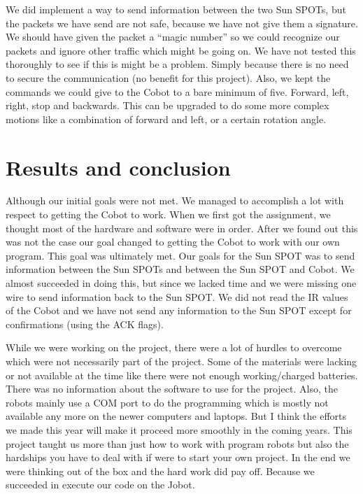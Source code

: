 \documentclass[a4paper,10pt]{article} %
\begin{document}
We did implement a way to send information between the two Sun SPOTs, but the
packets we have send are not safe, because we have not give them a signature.
We should have given the packet a ``magic number'' so we could recognize our
packets and ignore other traffic which might be going on. We have not tested
this thoroughly to see if this is might be a problem. Simply because there is no
need to secure the communication (no benefit for this project). Also, we kept
the commands we could give to the Cobot to a bare minimum of five. Forward,
left, right, stop and backwards. This can be upgraded to do some more complex
motions like a combination of forward and left, or a certain rotation angle.


\section{Results and conclusion} %



Although our initial goals were not met. We managed to accomplish a lot with
respect to getting the Cobot to work. When we first got the assignment, we
thought most of the hardware and software were in order. After we found out this
was not the case our goal changed to getting the Cobot to work with our own
program. This goal was ultimately met. Our goals for the Sun SPOT was to send
information between the Sun SPOTs and between the Sun SPOT and Cobot. We almost
succeeded in doing this, but since we lacked time and we were missing one wire
to send information back to the Sun SPOT. We did not read the IR values of the
Cobot and we have not send any information to the Sun SPOT except for
confirmations (using the ACK flags).

While we were working on the project, there were a lot of hurdles to overcome
which were not necessarily part of the project. Some of the materials were
lacking or not available at the time like there were not enough working/charged
batteries. There was no information about the software to use for the project.
Also, the robots mainly use a COM port to do the programming which is mostly not
available any more on the newer computers and laptops. But I think the efforts
we made this year will make it proceed more smoothly in the coming years. This
project taught us more than just how to work with program robots but also the
hardships you have to deal with if were to start your own project. In the end we
were thinking out of the box and the hard work did pay off. Because we succeeded
in execute our code on the Jobot.
\end{document}

